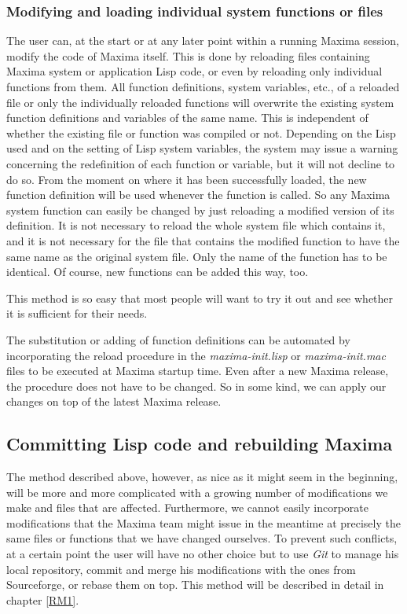 \documentclass[../Maxima_Workbook.tex]{subfiles}
\begin{document}
\subsubsection{Modifying and loading individual system functions or files}

The user can, at the start or at any later point within a running Maxima session, modify the code of Maxima itself. This is done by reloading files containing Maxima system or application Lisp code, or even by reloading only individual functions from them. All function definitions, system variables, etc., of a reloaded file or only the individually reloaded functions will overwrite the existing system function definitions and variables of the same name. This is independent of whether the existing file or function was compiled or not.  Depending on the Lisp used and on the setting of Lisp system variables, the system may issue a warning concerning the redefinition of each function or variable, but it will not decline to do so. From the moment on where it has been successfully loaded, the new function definition will be used whenever the function is called. So any Maxima system function can easily be changed by just reloading a modified version of its definition. It is not necessary to reload the whole system file which contains it, and it is not necessary for the file that contains the modified function to have the same name as the original system file. Only the name of the function has to be identical. Of course, new functions can be added this way, too.

\lz This method is so easy that most people will want to try it out and see whether it is sufficient for their needs. 

\lz The substitution or adding of function definitions can be automated by incorporating the reload procedure in the \emph{maxima-init.lisp} or \emph{maxima-init.mac} files to be executed at Maxima startup time. Even after a new Maxima release, the procedure does not have to be changed. So in some kind, we can apply our changes on top of the latest Maxima release.

\subsection{Committing Lisp code and rebuilding Maxima}

The method described above, however, as nice as it might seem in the beginning, will be more and more complicated with a growing number of modifications we make and files that are affected. Furthermore, we cannot easily incorporate modifications that the Maxima team might issue in the meantime at precisely the same files or functions that we have changed ourselves. To prevent such conflicts, at a certain point the user will have no other choice but to use \emph{Git} to manage his local repository, commit and merge his modifications with the ones from Sourceforge, or rebase them on top. This method will be described in detail in chapter \ref{RM1}.
\end{document}

